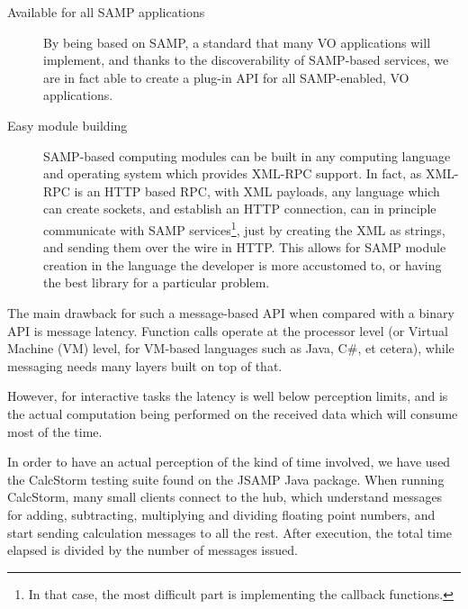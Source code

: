 \begin{description}
			\item[Available for all SAMP applications] By being
			based on SAMP, a standard that many VO applications
			will implement, and thanks to the discoverability of
			SAMP-based services, we are in fact able to create a
			plug-in API for all SAMP-enabled, VO applications.
			
			\item[Easy module building] SAMP-based computing
			modules can be built in any computing language and
			operating system which provides XML-RPC support.
			In fact, as XML-RPC is an HTTP based RPC, with XML
			payloads, any language which can create sockets,
			and establish an HTTP connection, can in principle
			communicate with SAMP services\footnote{In that
			case, the most difficult part is implementing the
			callback functions.}, just by creating the XML
			as strings, and sending them over the wire in HTTP.
			This allows for SAMP module creation in the language
			the developer is more accustomed to, or having the
			best library for a particular problem.
		\end{description}
		
		The main drawback for such a message-based API when
		compared with a binary API is message latency. Function
		calls operate at the processor level (or Virtual Machine
		(VM) level, for VM-based languages such as Java, C\#, et
		cetera), while messaging needs many layers built on top of
		that.
		
		However, for interactive tasks the latency is well below
		perception limits, and is the actual computation being
		performed on the received data which will consume most of
		the time.
		
		In order to have an actual perception of the kind of
		time involved, we have used the CalcStorm testing suite
		found on the JSAMP\urlnote{\jsampurl} Java package. When
		running CalcStorm, many small clients connect to the hub,
		which understand messages for adding, subtracting,
		multiplying and dividing floating point numbers, and start
		sending calculation messages to all the rest. After
		execution, the total time elapsed is divided by the number
		of messages issued.
		
